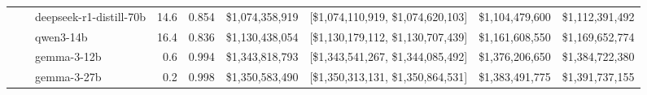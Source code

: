 \begin{table}[t]
\begin{tabular}{lllrrrrrr}
   &  & deepseek-r1-distill-70b & 14.6 & 0.854 & \$1,074,358,919 & [\$1,074,110,919, \$1,074,620,103] & \$1,104,479,600 & \$1,112,391,492 \\
   &  & qwen3-14b & 16.4 & 0.836 & \$1,130,438,054 & [\$1,130,179,112, \$1,130,707,439] & \$1,161,608,550 & \$1,169,652,774 \\
   &  & gemma-3-12b & 0.6 & 0.994 & \$1,343,818,793 & [\$1,343,541,267, \$1,344,085,492] & \$1,376,206,650 & \$1,384,722,380 \\
   &  & gemma-3-27b & 0.2 & 0.998 & \$1,350,583,490 & [\$1,350,313,131, \$1,350,864,531] & \$1,383,491,775 & \$1,391,737,155 \\
\bottomrule
\end{tabular}
\end{table}